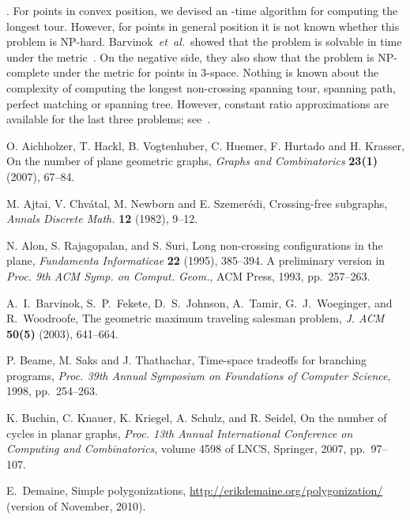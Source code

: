 \documentclass[11pt]{article}
\def\etal{{\it et~al.}\,}
\begin{document}
. For points in convex position, we devised an -time
algorithm for computing the longest tour.
However, for points in general position it is not known
whether this problem is NP-hard.
Barvinok~\etal\cite{BFJ+98} showed that the problem is solvable in
 time under the  metric~\cite{BFJ+98}.
On the negative side, they also show that the problem is
NP-complete under the  metric for points in 3-space.
Nothing is known about the complexity of computing the
longest non-crossing spanning tour, spanning path,
perfect matching or spanning tree. However, constant ratio
approximations are available for the last three problems;
see~\cite{ARS95,DT10}.



\begin{thebibliography}{99}

 O. Aichholzer, T. Hackl, B. Vogtenhuber, C. Huemer,
F. Hurtado and H. Krasser,
On the number of plane geometric graphs,
\emph{Graphs and Combinatorics} {\bf 23(1)} (2007), 67--84.

 M. Ajtai, V. Chv\'atal, M. Newborn and E. Szemer\'edi,
Crossing-free subgraphs,
\emph{Annals Discrete Math.} {\bf 12} (1982), 9--12.

 N. Alon, S. Rajagopalan, and S. Suri,
Long non-crossing configurations in the plane,
{\em Fundamenta Informaticae} {\bf 22} (1995), 385--394.
A preliminary version in \emph{Proc. 9th ACM Symp. on Comput. Geom.},
ACM Press, 1993, pp.~257--263.



A.~I.~Barvinok, S.~P.~Fekete, D.~S.~Johnson, A.~Tamir,
G.~J.~Woeginger, and R.~Woodroofe,
The geometric maximum traveling salesman problem,
\emph{J. ACM} {\bf 50(5)} (2003), 641--664.

 P. Beame, M. Saks and J. Thathachar,
Time-space tradeoffs for branching programs,
{\it Proc. 39th Annual Symposium on Foundations of Computer Science},
1998, pp.~254--263.


K. Buchin, C. Knauer, K. Kriegel, A. Schulz, and R. Seidel,
On the number of cycles in planar graphs,
\emph{Proc. 13th Annual International Conference on
  Computing and Combinatorics},
  volume 4598 of LNCS, Springer, 2007, pp.~97--107.


E.\ Demaine, Simple polygonizations,
\url{http://erikdemaine.org/polygonization/} (version of November, 2010).




\end{thebibliography}
\end{document}
